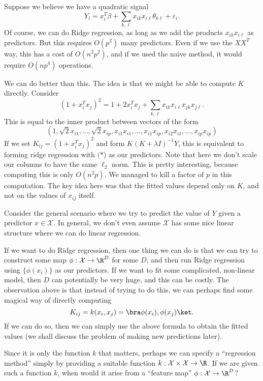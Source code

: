 \documentclass[a4paper]{article}
\begin{document}
Suppose we believe we have a quadratic signal
\[
  Y_i = x_i^T \beta + \sum_{k, \ell} x_{ik} x_{i\ell} \theta_{k\ell} + \varepsilon_i.
\]
Of course, we can do Ridge regression, as long as we add the products $x_{ik} x_{i\ell}$ as predictors. But this requires $O(p^2)$ many predictors. Even if we use the $XX^T$ way, this has a cost of $O(n^2 p^2)$, and if we used the naive method, it would require $O(np^4)$ operations.

We can do better than this. The idea is that we might be able to compute $K$ directly. Consider
\[
  (1 + x_i^T x_j)^2 = 1 + 2 x_i^T x_j + \sum_{k, \ell} x_{ik} x_{i\ell} x_{jk}x_{j\ell}.
\]
This is equal to the inner product between vectors of the form
\[
  (1, \sqrt{2} x_{i1}, \ldots, \sqrt{2}x_{ip}, x_{i1} x_{i1}, \ldots, x_{i1} x_{ip}, x_{i2} x_{i1}, \ldots, x_{ip} x_{ip})\tag{$*$}
\]
If we set $K_{ij} = (1 + x_i^T x_j)^2$ and form $K(K + \lambda I)^{-1} Y$, this is equivalent to forming ridge regression with $(*$) as our predictors. Note that here we don't scale our columns to have the same $\ell_2$ norm. This is pretty interesting, because computing this is only $O(n^2p)$. We managed to kill a factor of $p$ in this computation. The key idea here was that the fitted values depend only on $K$, and not on the values of $x_{ij}$ itself.

Consider the general scenario where we try to predict the value of $Y$ given a predictor $x \in \mathcal{X}$. In general, we don't even assume $\mathcal{X}$ has some nice linear structure where we can do linear regression.

If we want to do Ridge regression, then one thing we can do is that we can try to construct some map $\phi: \mathcal{X} \to \R^D$ for some $D$, and then run Ridge regression using $\{\phi(x_i)\}$ as our predictors. If we want to fit some complicated, non-linear model, then $D$ can potentially be very huge, and this can be costly. The observation above is that instead of trying to do this, we can perhaps find some magical way of directly computing
\[
  K_{ij} = k(x_i, x_j) = \bra \phi(x_i), \phi(x_j)\ket.
\]
If we can do so, then we can simply use the above formula to obtain the fitted values (we shall discuss the problem of making new predictions later).

Since it is only the function $k$ that matters, perhaps we can specify a ``regression method'' simply by providing a suitable function $k: \mathcal{X} \times \mathcal{X} \to \R$. If we are given such a function $k$, when would it arise from a ``feature map'' $\phi: \mathcal{X} \to \R^D$?
\end{document}
